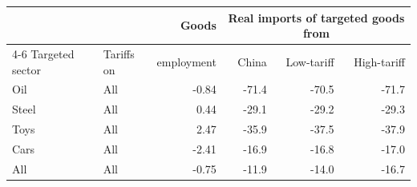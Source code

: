 \begin{tabular}{llrrrr}
\toprule
 & & Goods & \multicolumn{3}{c}{Real imports of targeted goods from} \\
\cmidrule(lr){4-6}
Targeted sector & Tariffs on & employment & China & Low-tariff & High-tariff \\
\midrule
Oil & All & -0.84 & -71.4 & -70.5 & -71.7 \\
\midrule
Steel & All & 0.44 & -29.1 & -29.2 & -29.3 \\
\midrule
Toys & All & 2.47 & -35.9 & -37.5 & -37.9 \\
\midrule
Cars & All & -2.41 & -16.9 & -16.8 & -17.0 \\
\midrule
All & All & -0.75 & -11.9 & -14.0 & -16.7 \\
\bottomrule
\end{tabular}
